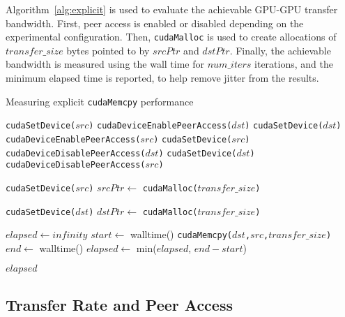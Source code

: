 Algorithm~\ref{alg:explicit} is used to evaluate the achievable GPU-GPU transfer bandwidth.
First, peer access is enabled or disabled depending on the experimental configuration.
Then, \texttt{cudaMalloc} is used to create allocations of $transfer\_size$ bytes pointed to by $srcPtr$ and $dstPtr$.
Finally, the achievable bandwidth is measured using the wall time for $num\_iters$ iterations, and the minimum elapsed time is reported, to help remove jitter from the results.

\begin{algorithm}
	\caption{Measuring explicit \texttt{cudaMemcpy} performance}
	\label{alg:explicit}
	\begin{algorithmic}[1]
		\Statex
		\State \texttt{cudaSetDevice($src$)}
		\State \texttt{cudaDeviceEnablePeerAccess($dst$)}
		\State \texttt{cudaSetDevice($dst$)}
		\State \texttt{cudaDeviceEnablePeerAccess($src$)}
		\Else
		\State \texttt{cudaSetDevice($src$)}
		\State \texttt{cudaDeviceDisablePeerAccess($dst$)}
		\State \texttt{cudaSetDevice($dst$)}
		\State \texttt{cudaDeviceDisablePeerAccess($src$)}        
		\EndIf
		
		\State \texttt{cudaSetDevice($src$)} 
		\State $srcPtr \gets$ \texttt{cudaMalloc($transfer\_size$)}
		
		\State \texttt{cudaSetDevice($dst$)} 
		\State $dstPtr \gets$ \texttt{cudaMalloc($transfer\_size$)}
		
		\State $elapsed \gets infinity$ 
		\State $start \gets$ walltime()
		\State \texttt{cudaMemcpy($dst$,$src$,$transfer\_size$)}
		\State $end \gets$ walltime()
		\State $elapsed \gets$ min($elapsed$, $end-start$)
		\EndFor
		
		\Return $elapsed$
		\EndFunction
		
	\end{algorithmic}
\end{algorithm}

\subsection{Transfer Rate and Peer Access}
\label{sec:explicit-peer-bandwidth}

